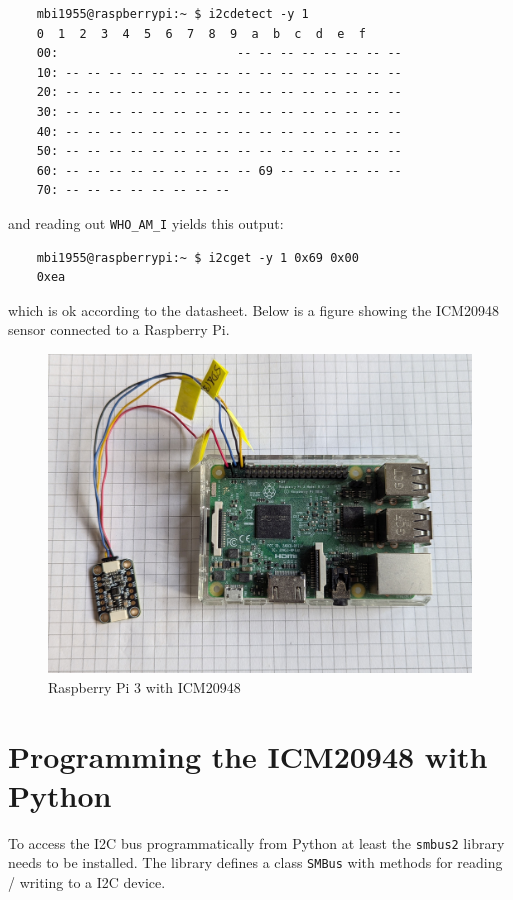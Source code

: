 \documentclass[paper=a4, oneside, fontsize=11pt,
parskip=full]{scrartcl}
\begin{document}
\begin{verbatim}
	mbi1955@raspberrypi:~ $ i2cdetect -y 1
	0  1  2  3  4  5  6  7  8  9  a  b  c  d  e  f
	00:                         -- -- -- -- -- -- -- --
	10: -- -- -- -- -- -- -- -- -- -- -- -- -- -- -- --
	20: -- -- -- -- -- -- -- -- -- -- -- -- -- -- -- --
	30: -- -- -- -- -- -- -- -- -- -- -- -- -- -- -- --
	40: -- -- -- -- -- -- -- -- -- -- -- -- -- -- -- --
	50: -- -- -- -- -- -- -- -- -- -- -- -- -- -- -- --
	60: -- -- -- -- -- -- -- -- -- 69 -- -- -- -- -- --
	70: -- -- -- -- -- -- -- --
\end{verbatim}


and reading out \verb|WHO_AM_I| yields this output:

\begin{verbatim}
	mbi1955@raspberrypi:~ $ i2cget -y 1 0x69 0x00
	0xea
\end{verbatim}

which is ok according to the datasheet. Below is a figure showing the ICM20948 sensor connected to a Raspberry Pi.

\begin{figure}[h]
	\centering
	\includegraphics[width=12cm]{images/rpi3_with_icm20948.jpg}
	\caption{Raspberry Pi 3 with ICM20948}
\end{figure}	


\section{Programming the ICM20948 with Python}

To access the I2C bus programmatically from Python at least the \verb|smbus2| library needs to be installed. The library defines a class \verb|SMBus| with methods for reading / writing to a I2C device.
\end{document}
